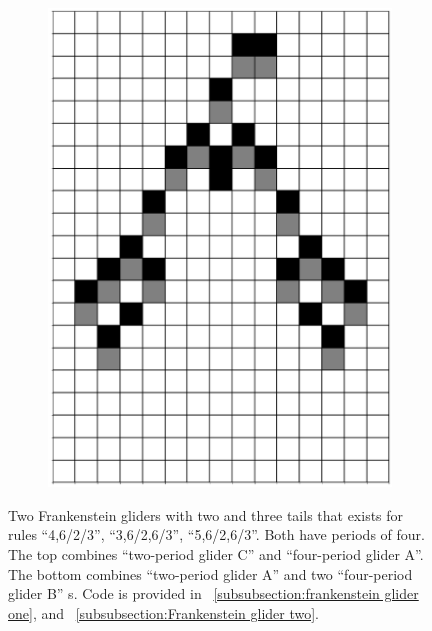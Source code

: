 \documentclass[12pt]{article}
\numberwithin{figure}{section} %
\begin{document}
\begin{figure}[H]
\begin{subfigure}{0.19\textwidth}
     \includegraphics[width=\linewidth]{Section4/26.4}
     \subcaption{}
   \end{subfigure}
   \setcounter{subfigure}{0}
\caption[Frankenstein gliders]{Two Frankenstein gliders with two and three tails that exists for rules “4,6/2/3”, “3,6/2,6/3”, “5,6/2,6/3”. Both have periods of four. The top combines “two-period glider C” and “four-period glider A”. The bottom combines “two-period glider A” and two “four-period glider B” s. Code is provided in ~\ref{subsubsection:frankenstein glider one}, and ~\ref{subsubsection:Frankenstein glider two}.}
\label{fig:Frankenstein gliders}
\end{figure}
\end{document}

